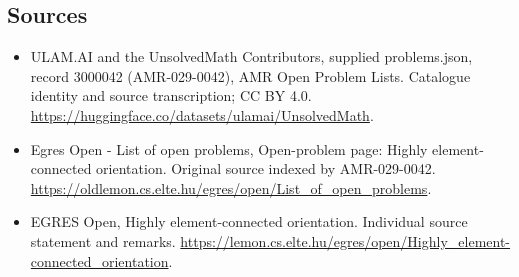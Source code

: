 \documentclass[11pt,a4paper]{article}
\begin{document}
\subsection{Sources}
\begin{itemize}
\item[S1] ULAM.AI and the UnsolvedMath Contributors, supplied problems.json, record 3000042 (AMR-029-0042), AMR Open Problem Lists. Catalogue identity and source transcription; CC BY 4.0.
\url{https://huggingface.co/datasets/ulamai/UnsolvedMath}.
\item[S2] Egres Open - List of open problems, Open-problem page: Highly element-connected orientation. Original source indexed by AMR-029-0042.
\url{https://oldlemon.cs.elte.hu/egres/open/List_of_open_problems}.
\item[S3] EGRES Open, Highly element-connected orientation. Individual source statement and remarks.
\url{https://lemon.cs.elte.hu/egres/open/Highly_element-connected_orientation}.
\end{itemize}
\end{document}
